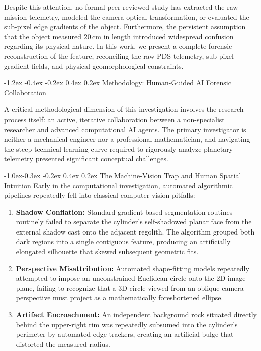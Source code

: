 \documentclass[11pt,a4paper]{article}
\makeatletter
\renewcommand\section{\@startsection {section}{1}{\z@}%
                                   {-1.2ex \@plus -0.4ex \@minus -0.2ex}%
                                   {0.4ex \@plus 0.2ex}%
                                   {\normalfont\large\bfseries}}
\renewcommand\subsection{\@startsection{subsection}{2}{\z@}%
                                     {-1.0ex\@plus -0.3ex \@minus -0.2ex}%
                                     {0.4ex \@plus 0.2ex}%
                                     {\normalfont\normalsize\bfseries}}
\makeatother
\begin{document}
Despite this attention, no formal peer-reviewed study has extracted the raw mission telemetry, modeled the camera optical transformation, or evaluated the sub-pixel edge gradients of the object. Furthermore, the persistent assumption that the object measured $20\,\text{cm}$ in length introduced widespread confusion regarding its physical nature. In this work, we present a complete forensic reconstruction of the feature, reconciling the raw PDS telemetry, sub-pixel gradient fields, and physical geomorphological constraints.

\section{Methodology: Human-Guided AI Forensic Collaboration}

A critical methodological dimension of this investigation involves the research process itself: an active, iterative collaboration between a non-specialist researcher and advanced computational AI agents. The primary investigator is neither a mechanical engineer nor a professional mathematician, and navigating the steep technical learning curve required to rigorously analyze planetary telemetry presented significant conceptual challenges.

\subsection{The Machine-Vision Trap and Human Spatial Intuition}
Early in the computational investigation, automated algorithmic pipelines repeatedly fell into classical computer-vision pitfalls:
\begin{enumerate}
	\item \textbf{Shadow Conflation:} Standard gradient-based segmentation routines routinely failed to separate the cylinder's self-shadowed planar face from the external shadow cast onto the adjacent regolith. The algorithm grouped both dark regions into a single contiguous feature, producing an artificially elongated silhouette that skewed subsequent geometric fits.
	\item \textbf{Perspective Misattribution:} Automated shape-fitting models repeatedly attempted to impose an unconstrained Euclidean circle onto the 2D image plane, failing to recognize that a 3D circle viewed from an oblique camera perspective must project as a mathematically foreshortened ellipse.
	\item \textbf{Artifact Encroachment:} An independent background rock situated directly behind the upper-right rim was repeatedly subsumed into the cylinder's perimeter by automated edge-trackers, creating an artificial bulge that distorted the measured radius.
\end{enumerate}
\end{document}
